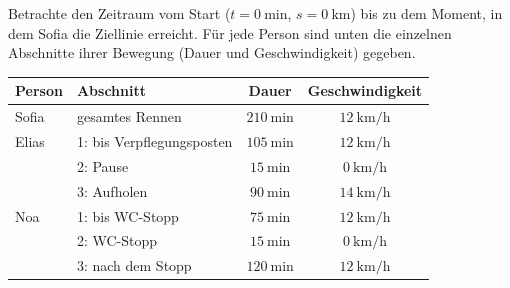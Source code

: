 \documentclass[addpoints,11pt,a4paper]{exam}
\newlength{\antwortraumlen}
\newcommand{\Antwortraum}[1]{%
  \pgfmathsetlength{\antwortraumlen}{#1*2.5cm}%
  \begin{answerbox}
    \rule{0pt}{\antwortraumlen}%
  \end{answerbox}%
}
\begin{document}
\begin{questions}
\begin{taskbox}
\question[12] Betrachte den Zeitraum vom Start ($t=\SI{0}{\minute}$,
$s=\SI{0}{\kilo\meter}$) bis zu dem Moment, in dem Sofia die Ziellinie
erreicht. Für jede Person sind unten die einzelnen Abschnitte ihrer
Bewegung (Dauer und Geschwindigkeit) gegeben.

\begin{center}
\begin{tabular}{@{}llcc@{}}
\toprule
\textbf{Person} & \textbf{Abschnitt} & \textbf{Dauer} & \textbf{Geschwindigkeit}\\
\midrule
Sofia & gesamtes Rennen & $\SI{210}{\minute}$ & $\SI{12}{\kilo\meter\per\hour}$\\
\midrule
Elias & 1: bis Verpflegungsposten & $\SI{105}{\minute}$ & $\SI{12}{\kilo\meter\per\hour}$\\
 & 2: Pause & $\SI{15}{\minute}$ & $\SI{0}{\kilo\meter\per\hour}$\\
 & 3: Aufholen & $\SI{90}{\minute}$ & $\SI{14}{\kilo\meter\per\hour}$\\
\midrule
Noa & 1: bis WC-Stopp & $\SI{75}{\minute}$ & $\SI{12}{\kilo\meter\per\hour}$\\
 & 2: WC-Stopp & $\SI{15}{\minute}$ & $\SI{0}{\kilo\meter\per\hour}$\\
 & 3: nach dem Stopp & $\SI{120}{\minute}$ & $\SI{12}{\kilo\meter\per\hour}$\\
\bottomrule
\end{tabular}
\end{center}

\end{taskbox}
\end{questions}
\end{document}
